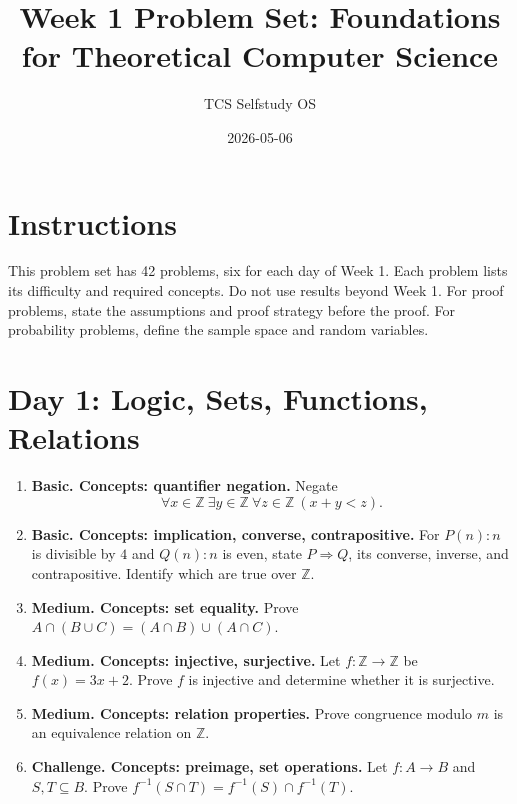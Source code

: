 \documentclass[11pt]{article}
\title{Week 1 Problem Set: Foundations for Theoretical Computer Science}
\author{TCS Selfstudy OS}
\date{2026-05-06}
\begin{document}
\maketitle

\section*{Instructions}
This problem set has 42 problems, six for each day of Week 1. Each problem lists its difficulty and required concepts. Do not use results beyond Week 1. For proof problems, state the assumptions and proof strategy before the proof. For probability problems, define the sample space and random variables.

\section{Day 1: Logic, Sets, Functions, Relations}
\begin{enumerate}[label=\textbf{1.\arabic*.}]
\item \textbf{Basic. Concepts: quantifier negation.} Negate
$$\forall x\in\mathbb{Z}\ \exists y\in\mathbb{Z}\ \forall z\in\mathbb{Z}\ (x+y<z).$$
\item \textbf{Basic. Concepts: implication, converse, contrapositive.} For $P(n): n$ is divisible by $4$ and $Q(n): n$ is even, state $P\Rightarrow Q$, its converse, inverse, and contrapositive. Identify which are true over $\mathbb{Z}$.
\item \textbf{Medium. Concepts: set equality.} Prove $A\cap(B\cup C)=(A\cap B)\cup(A\cap C)$.
\item \textbf{Medium. Concepts: injective, surjective.} Let $f:\mathbb{Z}\to\mathbb{Z}$ be $f(x)=3x+2$. Prove $f$ is injective and determine whether it is surjective.
\item \textbf{Medium. Concepts: relation properties.} Prove congruence modulo $m$ is an equivalence relation on $\mathbb{Z}$.
\item \textbf{Challenge. Concepts: preimage, set operations.} Let $f:A\to B$ and $S,T\subseteq B$. Prove $f^{-1}(S\cap T)=f^{-1}(S)\cap f^{-1}(T)$.
\end{enumerate}
\end{document}
